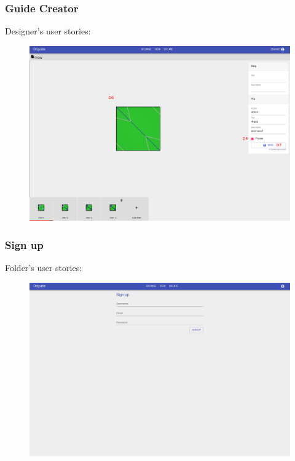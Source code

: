 \subsubsection{Guide Creator}

Designer's user stories:
\begin{enumerate}
	\setcounter{enumi}{4}
\end{enumerate}

\begin{figure}[H]
  	\centering
    \includegraphics[width=\textwidth]{assets/5-guideCreator.png}
\end{figure}

\subsubsection{Sign up}

Folder's user stories:
\begin{enumerate}
	\setcounter{enumi}{15}
\end{enumerate}

\begin{figure}[H]
  	\centering
    \includegraphics[width=\textwidth]{assets/5-signUp.png}
\end{figure}

